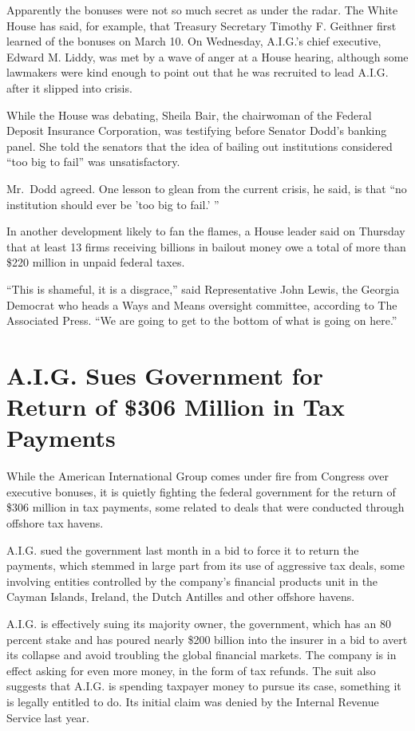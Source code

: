 \documentclass[12pt,a4paper,onecolumn]{article}
\begin{document}
\begin{CJK*}{GBK}{song}
Apparently the bonuses were not so much secret as under the radar. The White House has said, for
example, that Treasury Secretary Timothy F. Geithner first learned of the bonuses on March 10. On
Wednesday, A.I.G.'s chief executive, Edward M. Liddy, was met by a wave of anger at a House hearing,
although some lawmakers were kind enough to point out that he was recruited to lead A.I.G. after it
slipped into crisis.

While the House was debating, Sheila Bair, the chairwoman of the Federal Deposit Insurance
Corporation, was testifying before Senator Dodd's banking panel. She told the senators that the idea
of bailing out institutions considered ``too big to fail'' was unsatisfactory.

Mr.~Dodd agreed. One lesson to glean from the current crisis, he said, is that ``no institution
should ever be 'too big to fail.' ''

In another development likely to fan the flames, a House leader said on Thursday that at least 13
firms receiving billions in bailout money owe a total of more than \$220 million in unpaid federal
taxes.

``This is shameful, it is a disgrace,'' said Representative John Lewis, the Georgia Democrat who
heads a Ways and Means oversight committee, according to The Associated Press. ``We are going to get
to the bottom of what is going on here.''

\section{A.I.G. Sues Government for Return of \$306 Million in Tax Payments}

While the American International Group comes under fire from Congress over executive bonuses, it is
quietly fighting the federal government for the return of \$306 million in tax payments, some
related to deals that were conducted through offshore tax havens.

A.I.G. sued the government last month in a bid to force it to return the payments, which stemmed in
large part from its use of aggressive tax deals, some involving entities controlled by the company's
financial products unit in the Cayman Islands, Ireland, the Dutch Antilles and other offshore
havens.

A.I.G. is effectively suing its majority owner, the government, which has an 80 percent stake and
has poured nearly \$200 billion into the insurer in a bid to avert its collapse and avoid troubling
the global financial markets. The company is in effect asking for even more money, in the form of
tax refunds. The suit also suggests that A.I.G. is spending taxpayer money to pursue its case,
something it is legally entitled to do. Its initial claim was denied by the Internal Revenue Service
last year.


\end{CJK*}
\end{document}
